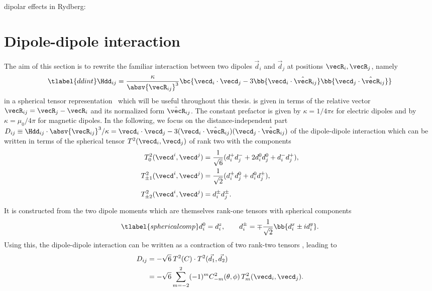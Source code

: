 dipolar effects in Rydberg: \cite{Westermann2006,Nipper2012b}


\section{Dipole-dipole interaction}
The aim of this section is to rewrite the familiar interaction between two dipoles $\vec{d}_i$ and $\vec{d}_j$ at positions $\vecR_i, \vecR_j$, namely
\begin{align} \tlabel{ddint}
\Hdd_{ij} = \frac{\kappa}{\absv{\vecR_{ij}}^3} \bc{ \vecd_i \cdot \vecd_j -3 \bb{ \vecd_i \cdot \hat{\vecR}_{ij} }\bb{ \vecd_j \cdot \hat{\vecR}_{ij} } }
\end{align}
in a spherical tensor representation~\cite{Micheli2007,Gorshkov2011c} which will be useful throughout this thesis.
 is given in terms of the relative vector $\vecR_{ij} = \vecR_j - \vecR_i$ and its normalized form $\hat{\vecR}_{ij}$.
The constant prefactor is given by $\kappa = 1/4\pi\epsilon$ for electric dipoles and by
$\kappa = \mu_0 / 4\pi$ for magnetic dipoles.
In the following, we focus on the distance-independent part $D_{ij} \equiv \Hdd_{ij} \cdot \absv{\vecR_{ij}}^3/\kappa=\vecd_i \cdot \vecd_j -3 (\vecd_i \cdot \hat{\vecR}_{ij})(\vecd_j \cdot \hat{\vecR}_{ij})$ of the dipole-dipole interaction which can be written in terms of the spherical tensor $T^2(\vecd_i, \vecd_j)$ of rank two with the components
\begin{align}
T^2_0(\vecd^i, \vecd^j) &= \frac{1}{\sqrt{6}} (d_i^+ d_j^- + 2d_i^0 d_j^0 + d_i^{-} d_j^{+}), \\
T^2_{\pm 1}(\vecd^i, \vecd^j) &= \frac{1}{\sqrt{2}} (d_i^{\pm} d_j^0 + d_i^0 d_j^{\pm}), \\
T^2_{\pm 2}(\vecd^i, \vecd^j) &= d_i^{\pm} d_j^{\pm} \vphantom{\frac{1}{42}}.
\end{align}
It is constructed from the two dipole moments which are themselves rank-one tensors with spherical components
\begin{align} \tlabel{sphericalcomp}
d^0_i = d^z_i, \qquad d_i^\pm = \mp\frac{1}{\sqrt{2}}\bb{d_i^x\pm i d_i^y}.
\end{align}
Using this, the dipole-dipole interaction can be written as a contraction of two rank-two tensors \cite{Brown2003}, leading to
\begin{align}
    D_{ij} &= -\sqrt{6} \: T^2(C)\cdot T^2(\vec{d_1},\vec{d_2})\\
           &= -\sqrt{6}  \sum_{m=-2}^{2} (-1)^m C^2_{-m}(\theta,\phi) \, T^2_m(\vecd_i,\vecd_j).
\end{align}
